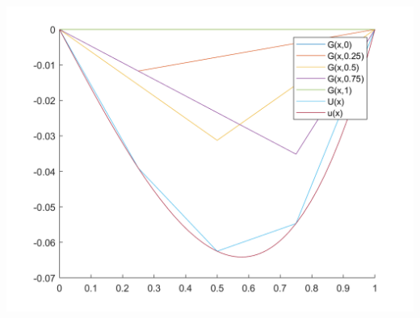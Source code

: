 \begin{solution}
    \begin{center}
        \includegraphics[scale=0.33]{greens.png}
    \end{center}

\end{solution}